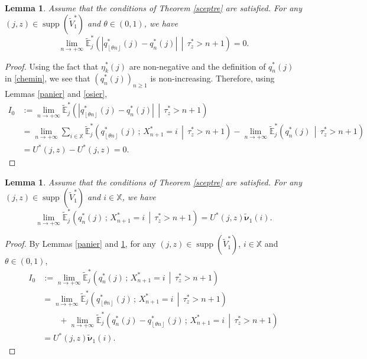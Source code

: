 \documentclass[12pt]{amsart}
\newtheorem{lemma}[theorem]{Lemma}
\theoremstyle{definition}
\numberwithin{equation}{section}
\newcommand*{\abs}[1]{\left\lvert#1\right\rvert}
\newcommand*{\pent}[1]{\left\lfloor#1\right\rfloor}
\newcommand*{\sachant}[2]{\left.#1 \,\middle|\,#2\right.}
\def\bb#1{\mathbb{#1}}
\def\tt#1{\tilde{#1}}
\def\tbs#1{\tilde{\boldsymbol{#1}}}
\def\tbb#1{\tilde{\mathbb{#1}}}
\def\geq{\geqslant}
\DeclareMathOperator{\supp}{supp}
\begin{document}
\begin{lemma} Assume that the conditions of Theorem \ref{sceptre} are satisfied.
\label{moulin}
For any $(j,z) \in \supp(\tt V_1^*)$ and $\theta \in (0,1)$, we have
\[
\lim_{n\to +\infty} \tbb E_j^* \left( \sachant{ \abs{ q_{\pent{\theta n}}^*(j)-q_n^*(j) } }{ \tau_z^* > n+1 } \right) = 0.
\]
\end{lemma}

\begin{proof}
Using the fact that $\eta_k^*(j)$ are non-negative and the definition of $q_n^*(j)$ in \eqref{chemin}, we see that $( q_n^*(j) )_{n\geq 1}$ is non-increasing. Therefore, using Lemmas \ref{panier} and \ref{osier},
\begin{align*}
I_0 &:= \lim_{n\to +\infty} \tbb E_j^* \left( \sachant{ \abs{ q_{\pent{\theta n}}^*(j)-q_n^*(j) } }{ \tau_z^* > n+1 } \right) \\
&=  \lim_{n\to +\infty} \sum_{i \in \bb X} \tbb E_j^* \left( \sachant{ q_{\pent{\theta n}}^*(j) \,;\, X_{n+1}^* = i }{ \tau_z^* > n+1 } \right) - \lim_{n\to +\infty} \tbb E_j^* \left( \sachant{ q_n^*(j) }{ \tau_z^* > n+1 } \right) \\
&= U^*(j,z) - U^*(j,z)  = 0.
\end{align*}
\end{proof}

\begin{lemma} Assume that the conditions of Theorem \ref{sceptre} are satisfied.
\label{aulne}
For any $(j,z) \in \supp(\tt V_1^*)$ and $i \in \bb X$, we have
\[
\lim_{n\to +\infty} \tbb E_j^* \left( \sachant{ q_n^*(j) \,;\, X_{n+1}^* = i }{ \tau_z^* > n+1 } \right) = U^*(j,z) \tbs \nu_1(i).
\]
\end{lemma}

\begin{proof}
By Lemmas \ref{panier} and \ref{moulin}, for any $(j,z) \in \supp(\tt V_1^*)$, $i \in \bb X$ and $\theta \in (0,1)$,
\begin{align*}
	I_0 &:= \lim_{n\to +\infty} \tbb E_j^* \left( \sachant{ q_n^*(j) \,;\, X_{n+1}^* = i }{ \tau_z^* > n+1 } \right) \\
	&= \lim_{n\to +\infty} \tbb E_j^* \left( \sachant{ q_{\pent{\theta n}}^*(j) \,;\, X_{n+1}^* = i }{ \tau_z^* > n+1 } \right) \\
	&\qquad+ \lim_{n\to +\infty} \tbb E_j^* \left( \sachant{ q_n^*(j) - q_{\pent{\theta n}}^*(j) \,;\, X_{n+1}^* = i }{ \tau_z^* > n+1 } \right) \\
	&= U^*(j,z) \tbs \nu_1(i).
\end{align*}
\end{proof}
\end{document}
